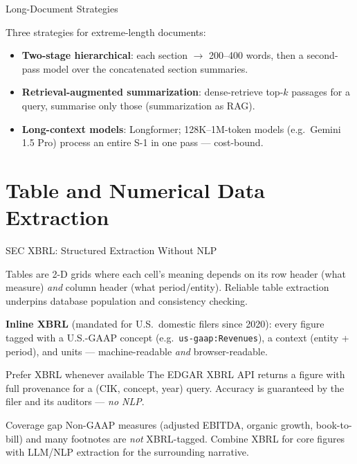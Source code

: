 \documentclass[9pt,t]{beamer}
\begin{document}
\begin{frame}{Long-Document Strategies}
\begin{underhood}
Three strategies for extreme-length documents:
\begin{itemize}
  \item \textbf{Two-stage hierarchical}: each section $\to$ 200--400 words, then a
        second-pass model over the concatenated section summaries.
  \item \textbf{Retrieval-augmented summarization}: dense-retrieve top-$k$ passages
        for a query, summarise only those (summarization as RAG).
  \item \textbf{Long-context models}: Longformer; 128K--1M-token models
        (e.g.\ Gemini 1.5 Pro) process an entire S-1 in one pass --- cost-bound.
\end{itemize}
\end{underhood}
\end{frame}

\section{Table and Numerical Data Extraction}

\begin{frame}{SEC XBRL: Structured Extraction Without NLP}
\begin{bigpicture}
Tables are 2-D grids where each cell's meaning depends on its row header (what
measure) \emph{and} column header (what period/entity). Reliable table extraction
underpins database population and consistency checking.
\end{bigpicture}

\medskip
\textbf{Inline XBRL} (mandated for U.S.\ domestic filers since 2020): every figure
tagged with a U.S.-GAAP concept (e.g.\ \texttt{us-gaap:Revenues}), a context
(entity + period), and units --- machine-readable \emph{and} browser-readable.

\smallskip
\begin{block}{Prefer XBRL whenever available}
The EDGAR XBRL API returns a figure with full provenance for a (CIK, concept,
year) query. Accuracy is guaranteed by the filer and its auditors --- \emph{no NLP}.
\end{block}

\smallskip
\begin{alertblock}{Coverage gap}
Non-GAAP measures (adjusted EBITDA, organic growth, book-to-bill) and many
footnotes are \emph{not} XBRL-tagged. Combine XBRL for core figures with
LLM/NLP extraction for the surrounding narrative.
\end{alertblock}
\end{frame}
\end{document}
